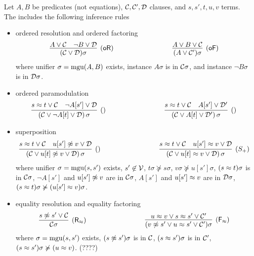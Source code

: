 
\begin{definition}\label{def:superposition-calculus}
	Let \( A,B \) be predicates (not equations),
	\( \mathcal{C},\mathcal{C}',\mathcal{D} \) clauses, and \( s,s', t,u,v \) terms.
	The  includes the following inference rules
	\begin{itemize}
		\item ordered resolution and ordered factoring
		\begin{gather*}
		\infer
		[\mathsf{(oR)}]
		{(\mcC \lor \mcD)\sigma}
		{{ A} \lor\mcC & { \lnot B} \lor\mcD}
		\hspace{3cm}
		\infer
		[\mathsf{(oF)}]
		{(A \lor \mcC')\sigma}
		{{ A}\lor B\lor\mcC}
		\end{gather*}
		where unifier \( \sigma=\operatorname{mgu}(A,B) \) exists,
		instance \( A\sigma \) is \txtSTRICTLY{} in \( \mathcal{C} \sigma \),
		and	instance \( \lnot B\sigma \) is \txtMAXIMAL{} in \( \mathcal{D}\sigma \).
		\item ordered paramodulation
		\begin{gather*}
		\infer
		[\mathsf{()}]
		{(\mcC\lor \lnot A[t]\lor\mcD)\,\sigma}
		{{ s\mEQ t} \lor\mcC\quad { \lnot A[s']}\lor\mcD}
		\hspace{3cm}
		\infer
		[\mathsf{()}]
		{(\mcC\lor A[t]\lor\mcD')\,\sigma}
		{{ s\mEQ t} \lor\mcC\quad { A[s']}\lor\mcD'}
\end{gather*}
\item superposition
\begin{gather*}
		\infer
		[()]
		{(\mcC\lor u[t]\mNE v\lor\mcD)\,\sigma}
		{{ s\mEQ t}\lor\mcC\quad { u[s']\mNE v}\lor\mcD}
		\hspace{3cm}
		\infer
		[(S_+)]
		{(\mcC\lor u[t]\mEQ v\lor\mcD)\,\sigma}
		{{ s\mEQ t}\lor\mcC\quad { u[s']\mEQ v}\lor\mcD}
		\end{gather*}
		where unifier \( \sigma=\operatorname{mgu}(s,s') \) exists,
		\( s'\not\in\mathcal{V} \),
		\( t\sigma\not\succcurlyeq s\sigma \),
		\( v\sigma\not\succcurlyeq u[s']\sigma \),
		\( (s\approx t)\sigma \) is \txtSTRICTLY{} in \( \mathcal{C}\sigma \),
		\( \lnot A[s'] \) and \( u[s']\not\approx v \) are \txtMAXIMAL{} in \( \mathcal{C}\sigma \),
		\( A[s'] \) and \( u[s']\approx v \) are \txtSTRICTLY{} in \( \mathcal{D}\sigma \),
		\( (s\approx t)\sigma\not\succcurlyeq(u[s']\approx v)\sigma \).
		\item
		equality resolution and equality factoring
		\[
		\infer
		[\mathsf{(R_\mEQ)}]
		{\mcC\sigma}
		{{s\mNE s'}\lor\mcC}
		\hspace{3cm}
		\infer
		[\mathsf{(F_\mEQ)}]
		{(v\mNE s'\lor u\mEQ s'\lor\mcC')\sigma}
		{{ u\mEQ v}\lor{s\mEQ s'}\lor\mcC'}
		\]
		where
		\( \sigma=\operatorname{mgu}(s,s') \) exists,
		\( (s\not\approx s')\sigma \) is \txtMAXIMAL{} in \( \mathcal{C} \),
		\( (s\approx s')\sigma \) is \txtSTRICTLY{} in \( \mathcal{C}' \),
		\( (s\approx s')\sigma\not\succcurlyeq(u\approx v) \). (????)
	\end{itemize}
\end{definition}

